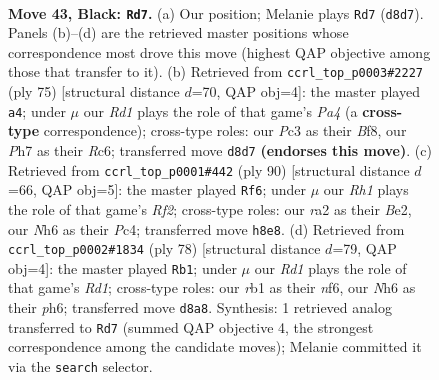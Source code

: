\documentclass[11pt]{article}
\begin{document}
\clearpage

\begin{figure}[p]\centering
\begin{subfigure}{0.46\textwidth}\centering
\resizebox{\linewidth}{!}{%
\newchessgame
\chessboard[
  setfen={3r3r/p5kp/7n/P5bB/8/1Pp3BP/R1P3P1/1R4K1 b - - 2 43},
  showmover=false,
  pgfstyle=straightmove, color=movearrow, markmove={d8-d7}
]}
\caption{}
\end{subfigure}\hfill
\begin{subfigure}{0.46\textwidth}\centering
\resizebox{\linewidth}{!}{%
\newchessgame
\chessboard[
  setfen={2r2b2/5k2/2rpp3/pp5p/4PB1P/5P2/PP4R1/1K4R1 b - - 7 38},
  showmover=false,
  pgfstyle=straightmove, color=movearrow, markmove={a5-a4}
]}
\caption{}
\end{subfigure}
\\[4pt]
\begin{subfigure}{0.46\textwidth}\centering
\resizebox{\linewidth}{!}{%
\newchessgame
\chessboard[
  setfen={8/2k1r2p/1pb3p1/p1n5/2P1p3/7P/P3BRP1/3R2K1 w - - 2 46},
  showmover=false,
  pgfstyle=straightmove, color=movearrow, markmove={f2-f6}
]}
\caption{}
\end{subfigure}\hfill
\begin{subfigure}{0.46\textwidth}\centering
\resizebox{\linewidth}{!}{%
\newchessgame
\chessboard[
  setfen={8/b1r2p1k/4pnpp/1B6/5P2/6P1/7P/3R1R1K w - - 2 40},
  showmover=false,
  pgfstyle=straightmove, color=movearrow, markmove={d1-b1}
]}
\caption{}
\end{subfigure}
\caption{\textbf{Move 43, Black: \texttt{Rd7}.} (a) Our position; Melanie plays \texttt{Rd7} (\texttt{d8d7}). Panels (b)--(d) are the retrieved master positions whose correspondence most drove this move (highest QAP objective among those that transfer to it). (b) Retrieved from \texttt{ccrl\_top\_p0003\#2227} (ply 75) [structural distance $d$=70, QAP obj=4]: the master played \texttt{a4}; under $\mu$ our \emph{Rd1} plays the role of that game's \emph{Pa4} (a \textbf{cross-type} correspondence); cross-type roles: our \emph{P}c3 as their \emph{B}f8, our \emph{P}h7 as their \emph{R}c6; transferred move \texttt{d8d7} \textbf{(endorses this move)}. (c) Retrieved from \texttt{ccrl\_top\_p0001\#442} (ply 90) [structural distance $d$=66, QAP obj=5]: the master played \texttt{Rf6}; under $\mu$ our \emph{Rh1} plays the role of that game's \emph{Rf2}; cross-type roles: our \emph{r}a2 as their \emph{B}e2, our \emph{N}h6 as their \emph{P}c4; transferred move \texttt{h8e8}. (d) Retrieved from \texttt{ccrl\_top\_p0002\#1834} (ply 78) [structural distance $d$=79, QAP obj=4]: the master played \texttt{Rb1}; under $\mu$ our \emph{Rd1} plays the role of that game's \emph{Rd1}; cross-type roles: our \emph{r}b1 as their \emph{n}f6, our \emph{N}h6 as their \emph{p}h6; transferred move \texttt{d8a8}. Synthesis: 1 retrieved analog transferred to \texttt{Rd7} (summed QAP objective 4, the strongest correspondence among the candidate moves); Melanie committed it via the \texttt{search} selector.}
\label{fig:thought-m85}
\end{figure}
\end{document}
